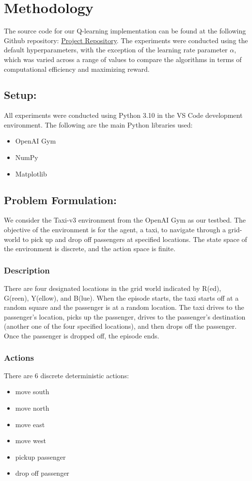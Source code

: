 \documentclass[conference]{IEEEtran}
\begin{document}
\section{Methodology}
The source code for our Q-learning implementation can be found at the following Github repository: \href{https://github.com/haider-06418/RL-Project/tree/main}{Project Repository}. The experiments were conducted using the default hyperparameters, with the exception of the learning rate parameter $\alpha$, which was varied across a range of values to compare the algorithms in terms of computational efficiency and maximizing reward.

\subsection{Setup:}
All experiments were conducted using Python 3.10 in the VS Code development environment. The following are the main Python libraries used:
\begin{itemize}
\item OpenAI Gym
\item NumPy
\item Matplotlib
\end{itemize}

\subsection{Problem Formulation:}
We consider the Taxi-v3 environment from the OpenAI Gym as our testbed. The objective of the environment is for the agent, a taxi, to navigate through a grid-world to pick up and drop off passengers at specified locations. The state space of the environment is discrete, and the action space is finite.
\newline
\subsubsection{Description} 
There are four designated locations in the grid world indicated by R(ed), G(reen), Y(ellow), and B(lue). When the episode starts, the taxi starts off at a random square and the passenger is at a random location. The taxi drives to the passenger's location, picks up the passenger, drives to the passenger's destination (another one of the four specified locations), and then drops off the passenger. Once the passenger is dropped off, the episode ends.
\newline
\subsubsection{Actions}
There are 6 discrete deterministic actions:
\begin{itemize}
    \item move south
    \item move north
    \item move east
    \item move west
    \item pickup passenger
    \item drop off passenger
    \newline
\end{itemize}
\end{document}
